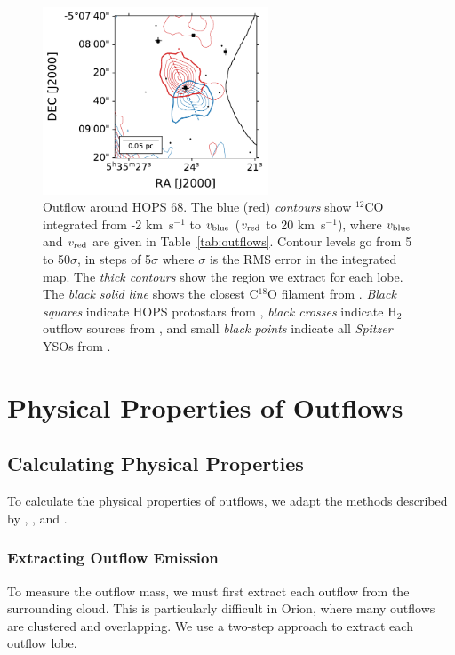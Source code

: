 \documentclass[twocolumn]{aastex63}
\newcommand{\example}{HOPS 68}
\newcommand{\kms}{km~s$^{-1}$}
\newcommand{\co}[1][]{\ensuremath{^{#1}}CO}
\begin{document}
\begin{figure}[htb!]
\centering
\includegraphics[width=0.6\textwidth]{stamp.pdf}
\caption{Outflow around \example{}. The blue (red) \textit{contours} show \co[12]{} integrated from -2 \kms{} to $v_{\rm blue}$ ($v_{\rm red}$ to 20 \kms{}), where $v_{\rm blue}$ and $v_{\rm red}$ are given in Table~\ref{tab:outflows}. Contour levels go from 5 to 50$\sigma$, in steps of 5$\sigma$ where $\sigma$ is the RMS error in the integrated map. The \textit{thick contours} show the region we extract for each lobe.%
The \textit{black solid line} shows the closest C$^{18}$O filament from \citet{Suri19}. \textit{Black squares} indicate HOPS protostars from \citet{Furlan16}, \textit{black crosses} indicate H$_2$ outflow sources from \citet{Davis09}, and small \textit{black points} indicate all \emph{Spitzer} YSOs from \citet{Megeath12}.\label{fig:stamp}}
\end{figure}

\section{Physical Properties of Outflows}\label{sec:physics}
\subsection{Calculating Physical Properties}
To calculate the physical properties of outflows, we adapt the methods described by \citet{Arce01}, \citet{Dunham14}, and \citet{ZhangY16}.
\subsubsection{Extracting Outflow Emission}\label{sec:extraction}
To measure the outflow mass, we must first extract each outflow from the surrounding cloud. This is particularly difficult in Orion, where many outflows are clustered and overlapping. We use a two-step approach to extract each outflow lobe.
\end{document}
